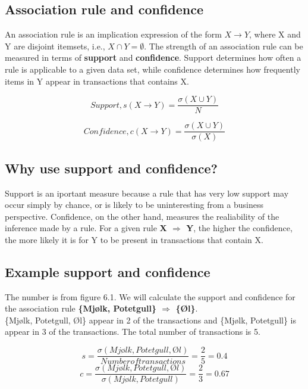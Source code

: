 		\subsection*{Association rule and confidence} 
		An association rule is an implication expression of
		the form $X \rightarrow Y$, where X and Y are disjoint itemsets, i.e., $X \cap Y = \emptyset$.
		The strength of an association rule can be measured in terms of {\bf support} and 
		{\bf confidence}. Support determines how often a rule is applicable to a given data
		set, while confidence determines how frequently items in Y appear in transactions that
		contains X. 

		\begin{equation}
			Support, s(X \rightarrow Y) = \frac{\sigma (X \cup Y)}{N}
		\end{equation}

		\begin{equation}
			Confidence, c(X \rightarrow Y) = \frac{\sigma(X \cup Y)}{\sigma(X)}
		\end{equation}

		\clearpage

		\subsection*{Why use support and confidence?}

		Support is an iportant measure because a rule that has very low support may occur simply
		by chance, or is likely to be uninteresting from a business perspective. 
		Confidence, on the other hand, measures the realiability of the inference made by a rule.
		For a given rule {\bf X $\Rightarrow$ Y}, the higher the confidence, the more likely it 
		is for Y to be present in transactions that contain X. 

		\subsection*{Example support and confidence}
		The number is from figure 6.1. We will calculate the support and confidence for the 
		association rule {\bf \{Mjølk, Potetgull\} $\Rightarrow$ \{Øl\}}. \\
		\{Mjølk, Potetgull, Øl\} appear in 2 of the transactions and \{Mjølk, Potetgull\} is 
		appear in 3 of the transactions. The total number of transactions is 5.   
		
		\begin{equation}
			s = \frac{\sigma(Mjølk,Potetgull, Øl)}{Number of transactions} = \frac{2}{5} = 0.4
		\end{equation}
		\begin{equation}
			c = \frac{\sigma(Mjølk, Potetgull, Øl)}{\sigma(Mjølk, Potetgull)} =  \frac{2}{3} = 0.67
		\end{equation}

